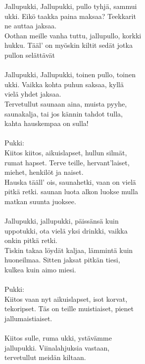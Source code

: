 
Jallupukki, Jallupukki, pullo tyhjä, sammui \\ ukki. Eikö taakka paina maksaa? Teekkarit \\ ne auttaa jaksaa. \\ Oothan meille vanha tuttu, jallupullo, korkki \\ hukku. Tääl' on myöskin kiltit sedät jotka \\ pullon selättävät \\ \hspace{10mm} \\ Jallupukki, Jallupukki, toinen pullo, toinen \\ ukki. Vaikka kohta puhun saksaa, kyllä \\ vielä yhdet jaksaa. \\ Tervetullut saunaan aina, muista pyyhe, \\ saunakalja, tai jos kännin tahdot tulla, \\ kahta hauskempaa on sulla! \\ \hspace{10mm} \\ Pukki: \\ Kiitos kiitos, aikuislapset, hullun silmät, \\ rumat hapset. Terve teille, hervant'laiset, \\ miehet, henkilöt ja naiset. \\ Hauska tääll' ois, saunahetki, vaan on vielä \\ pitkä retki. saunan luota alkon luokse mulla \\ matkan suunta juoksee. \\ \hspace{10mm} \\ Jallupukki, jallupukki, päissänsä kuin \\ uppotukki, ota vielä yksi drinkki, vaikka \\ onkin pitkä retki. \\ Tiskin takaa löydät kaljaa, lämmintä kuin \\ huoneilmaa. Sitten jaksat pitkän tiesi, \\ kulkea kuin aimo miesi. \\ \hspace{10mm} \\ Pukki: \\ Kiitos vaan nyt aikuislapset, isot korvat, \\ tekoripset. Täs on teille muistiaiset, pienet \\ jallumaistiaiset. \\ \hspace{10mm} \\ Kiitos sulle, ruma ukki, ystävämme \\ jallupukki. Viinalahjuksia vastaan, \\ tervetullut meidän kiltaan.